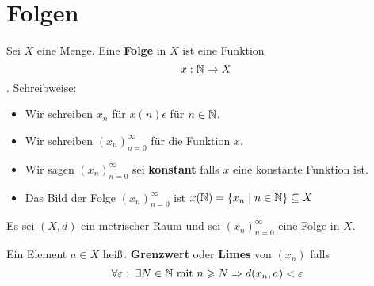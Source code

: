 \documentclass[main.tex]{subfiles}
\begin{document}
\section{Folgen}

\begin{Definition}[Folge]
  Sei $X$ eine Menge. Eine \textbf{Folge} in $X$ ist eine Funktion $$x: \mathbb{N} \to X$$.
  Schreibweise: \begin{itemize}
    \item Wir schreiben $x_n$ für $x(n) \epsilon$ für $n \in \mathbb{N}$.
    \item Wir schreiben $(x_n)_{n=0}^\infty$ für die Funktion $x$.
    \item Wir sagen $(x_n)_{n=0}^\infty$ sei \textbf{konstant} falls $x$ eine konstante Funktion ist.
    \item Das Bild der Folge $(x_n)_{n=0}^\infty$ ist $x(\mathbb{N}) = \{x_n \mid n \in \mathbb{N}\} \subseteq X$
  \end{itemize}
\end{Definition}

\begin{Definition}[Grenzwert]
  Es sei $(X,d)$ ein metrischer Raum und sei $(x_n)_{n=0}^\infty$ eine Folge in $X$.

  Ein Element $a \in X$ heißt \textbf{Grenzwert} oder \textbf{Limes} von $(x_n)$ falls
  $$\;\forall \varepsilon : \;\exists N \in \mathbb{N} \text{ mit } n \geqslant N \Rightarrow d(x_n,a) < \varepsilon$$
\end{Definition}
\end{document}
